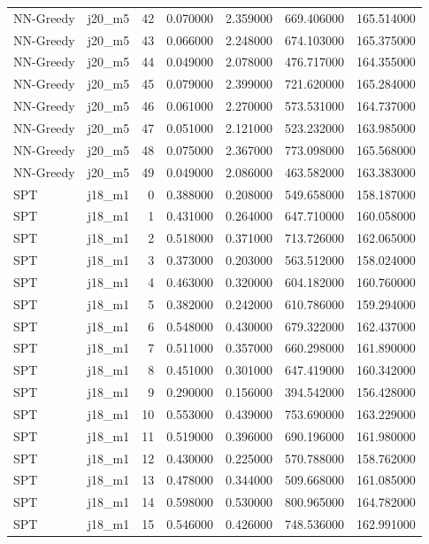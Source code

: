 \begin{tabular}{llrrrrr}
NN-Greedy & j20_m5 & 42 & 0.070000 & 2.359000 & 669.406000 & 165.514000 \\
NN-Greedy & j20_m5 & 43 & 0.066000 & 2.248000 & 674.103000 & 165.375000 \\
NN-Greedy & j20_m5 & 44 & 0.049000 & 2.078000 & 476.717000 & 164.355000 \\
NN-Greedy & j20_m5 & 45 & 0.079000 & 2.399000 & 721.620000 & 165.284000 \\
NN-Greedy & j20_m5 & 46 & 0.061000 & 2.270000 & 573.531000 & 164.737000 \\
NN-Greedy & j20_m5 & 47 & 0.051000 & 2.121000 & 523.232000 & 163.985000 \\
NN-Greedy & j20_m5 & 48 & 0.075000 & 2.367000 & 773.098000 & 165.568000 \\
NN-Greedy & j20_m5 & 49 & 0.049000 & 2.086000 & 463.582000 & 163.383000 \\
SPT & j18_m1 & 0 & 0.388000 & 0.208000 & 549.658000 & 158.187000 \\
SPT & j18_m1 & 1 & 0.431000 & 0.264000 & 647.710000 & 160.058000 \\
SPT & j18_m1 & 2 & 0.518000 & 0.371000 & 713.726000 & 162.065000 \\
SPT & j18_m1 & 3 & 0.373000 & 0.203000 & 563.512000 & 158.024000 \\
SPT & j18_m1 & 4 & 0.463000 & 0.320000 & 604.182000 & 160.760000 \\
SPT & j18_m1 & 5 & 0.382000 & 0.242000 & 610.786000 & 159.294000 \\
SPT & j18_m1 & 6 & 0.548000 & 0.430000 & 679.322000 & 162.437000 \\
SPT & j18_m1 & 7 & 0.511000 & 0.357000 & 660.298000 & 161.890000 \\
SPT & j18_m1 & 8 & 0.451000 & 0.301000 & 647.419000 & 160.342000 \\
SPT & j18_m1 & 9 & 0.290000 & 0.156000 & 394.542000 & 156.428000 \\
SPT & j18_m1 & 10 & 0.553000 & 0.439000 & 753.690000 & 163.229000 \\
SPT & j18_m1 & 11 & 0.519000 & 0.396000 & 690.196000 & 161.980000 \\
SPT & j18_m1 & 12 & 0.430000 & 0.225000 & 570.788000 & 158.762000 \\
SPT & j18_m1 & 13 & 0.478000 & 0.344000 & 509.668000 & 161.085000 \\
SPT & j18_m1 & 14 & 0.598000 & 0.530000 & 800.965000 & 164.782000 \\
SPT & j18_m1 & 15 & 0.546000 & 0.426000 & 748.536000 & 162.991000 \\

\end{tabular}
